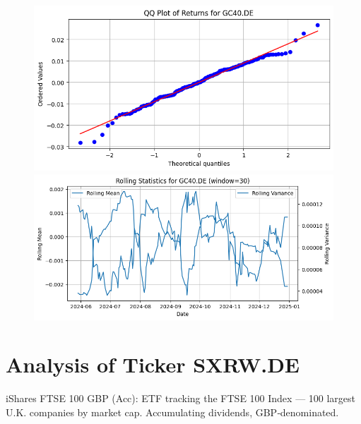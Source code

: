 \documentclass{article}%
\begin{document}
%


\begin{figure}[htbp]%
\begin{minipage}{0.48\textwidth}%
\includegraphics[width=\linewidth]{ticker_images/GC40.DE_qq_plot.png}%
\end{minipage}%
\begin{minipage}{0.48\textwidth}%
\includegraphics[width=\linewidth]{ticker_images/GC40.DE_rolling_stats.png}%
\end{minipage}%
\end{figure}

%
\section*{Analysis of Ticker SXRW.DE}%
\label{sec:AnalysisofTickerSXRW.DE}%
iShares FTSE 100 GBP (Acc): ETF tracking the FTSE 100 Index — 100 largest U.K. companies by market cap. Accumulating dividends, GBP‑denominated.%
\end{document}
